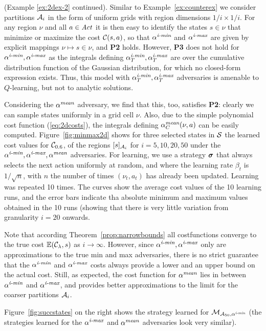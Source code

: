 \documentclass{llncs}
\begin{document}
\begin{example}
\label{ex:2dex-3}
(Example \ref{ex:2dex-2} continued). 
Similar to Example~\ref{ex:counterex} we consider partitions $\mathcal{A}_i$ in the form of uniform grids with
region dimensions $1/i \times 1/i$.
For any region $\nu$ and all $a\in\mathit{Act}$ it is then easy to identify the
states $s\in\nu$ that minimize or maximize the cost $\mathcal{C}(s,a)$, so that $\alpha^{\emph{i-min}}$ and $\alpha^{\emph{i-max}}$ are
given by explicit mappings $\nu\mapsto s\in\nu$, and  {\bf P2} holds. However, {\bf P3} does not hold for
$\alpha^{\emph{i-min}}, \alpha^{\emph{i-max}}$ as the integrals defining $\alpha^{\emph{i-min}}_T,\alpha^{\emph{i-max}}_T$ are over the cumulative
distribution function of the Gaussian distribution, for which no closed-form expression exists.
Thus, this model with  $\alpha^{\emph{i-min}}_T,\alpha^{\emph{i-max}}_T$ adversaries is amenable to $Q$-learning, but not
to analytic solutions. 

Considering the $\alpha^{\emph{mean}}$ adversary, we find that this, too, satisfies {\bf P2}: clearly we can sample
states uniformly in a grid cell $\nu$. Also, due to the simple polynomial cost function (\ref{eq:2dcosts}), the
integrals defining $\alpha^{\emph{mean}}_C(\nu,a)$ can be easily computed. 
Figure~\ref{fig:minmax2d} shows for three selected states in $\mathcal{S}$ the learned cost values
for $\mathcal{C}_{0.6}$, of the regions
$[s]_{\mathcal{A}_i}$ for $i=5,10,20,50$ under the $\alpha^{\emph{i-min}}, \alpha^{\emph{i-max}}, \alpha^{\emph{mean}}$ adversaries.
For learning, we use a strategy $\boldsymbol{\sigma}$ that always selects the next action uniformly at random, and
where the learning rate $\beta_t$ is $1/\sqrt{n}$, with $n$ the number of times $(\nu_t,a_t)$ has already
been updated. Learning was repeated 10 times. The curves show the average cost values of the 10 learning
runs, and the error bars indicate tha absolute minimum and maximum values obtained in the 10 runs (showing
that there is very little variation from granularity $i=20$ onwards.

Note that
according Theorem~\ref{prop:narrowbounds} all  costfunctions converge to
the true cost $\mathbb{E}(\mathcal{C}_{\lambda},s)$ as $i\rightarrow\infty$.
However, since $\alpha^{\emph{i-min}}, \alpha^{\emph{i-max}}$ only are approximations to the true min and max
adversaries, there is no strict guarantee that the $\alpha^{\emph{i-min}}$ and $\alpha^{\emph{i-max}}$ costs always provide
a lower and an upper bound on the actual cost. Still, as expected, the cost function for
$\alpha^{\emph{mean}}$ lies in between $\alpha^{\emph{i-min}}$ and $\alpha^{\emph{i-max}}$, and provides better approximations to the
limit for the coarser partitions $\mathcal{A}_i$. 

Figure~\ref{fig:succstates} on the right shows the strategy learned for $\mathcal{M}_{\mathcal{A}_{50},\alpha^{\emph{i-min}}}$
(the strategies learned for the $\alpha^{\emph{i-max}}$ and $\alpha^{\emph{mean}}$ adversaries look very similar).
\end{example}
\end{document}
